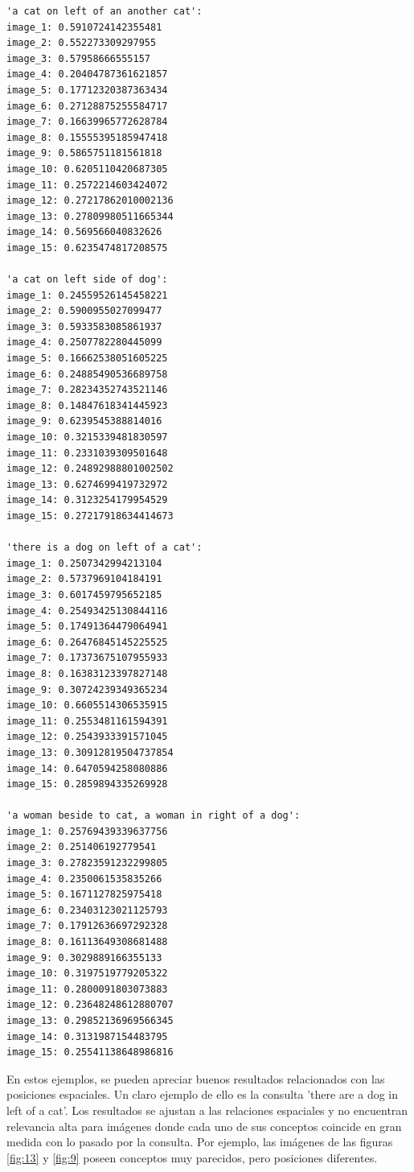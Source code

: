\begin{verbatim}
'a cat on left of an another cat':
image_1: 0.5910724142355481
image_2: 0.552273309297955
image_3: 0.57958666555157
image_4: 0.20404787361621857
image_5: 0.17712320387363434
image_6: 0.27128875255584717
image_7: 0.16639965772628784
image_8: 0.15555395185947418
image_9: 0.5865751181561818
image_10: 0.6205110420687305
image_11: 0.2572214603424072
image_12: 0.27217862010002136
image_13: 0.27809980511665344
image_14: 0.569566040832626
image_15: 0.6235474817208575

'a cat on left side of dog':
image_1: 0.24559526145458221
image_2: 0.5900955027099477
image_3: 0.5933583085861937
image_4: 0.2507782280445099
image_5: 0.16662538051605225
image_6: 0.24885490536689758
image_7: 0.28234352743521146
image_8: 0.14847618341445923
image_9: 0.6239545388814016
image_10: 0.3215339481830597
image_11: 0.2331039309501648
image_12: 0.24892988801002502
image_13: 0.6274699419732972
image_14: 0.3123254179954529
image_15: 0.27217918634414673

'there is a dog on left of a cat':
image_1: 0.2507342994213104
image_2: 0.5737969104184191
image_3: 0.6017459795652185
image_4: 0.25493425130844116
image_5: 0.17491364479064941
image_6: 0.26476845145225525
image_7: 0.17373675107955933
image_8: 0.16383123397827148
image_9: 0.30724239349365234
image_10: 0.6605514306535915
image_11: 0.2553481161594391
image_12: 0.2543933391571045
image_13: 0.30912819504737854
image_14: 0.6470594258080886
image_15: 0.2859894335269928

'a woman beside to cat, a woman in right of a dog':
image_1: 0.25769439339637756
image_2: 0.251406192779541
image_3: 0.27823591232299805
image_4: 0.2350061535835266
image_5: 0.1671127825975418
image_6: 0.23403123021125793
image_7: 0.17912636697292328
image_8: 0.16113649308681488
image_9: 0.3029889166355133
image_10: 0.3197519779205322
image_11: 0.2800091803073883
image_12: 0.23648248612880707
image_13: 0.29852136969566345
image_14: 0.3131987154483795
image_15: 0.25541138648986816

\end{verbatim}

En estos ejemplos, se pueden apreciar buenos resultados relacionados con las posiciones espaciales. Un claro ejemplo de ello es la consulta 'there are a dog in left of a cat'. Los resultados se ajustan a las relaciones espaciales y no encuentran relevancia alta para im\'agenes donde cada uno de sus conceptos coincide en gran medida con lo pasado por la consulta. Por ejemplo, las im\'agenes de las figuras \ref{fig:13} y \ref{fig:9} poseen conceptos muy parecidos, pero posiciones diferentes.

